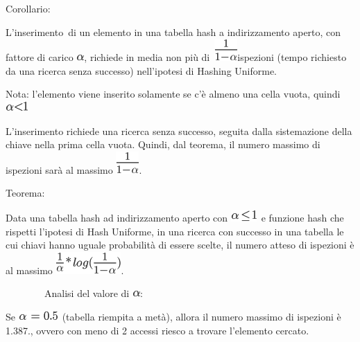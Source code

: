 \documentclass{article}
\begin{document}
{}

{Corollario}{:}

{L'inserimento}{~di un elemento in una tabella hash a indirizzamento
aperto, con fattore di carico }\includegraphics{images/image327.png}{,
richiede in media }{non più
di}{~}\includegraphics{images/image321.png}{ispezioni (tempo richiesto
da una ricerca senza successo) nell'ipotesi di }{Hashing Uniforme.}

{}

{Nota: l'elemento viene inserito solamente se c'è almeno una cella
vuota, quindi }\includegraphics{images/image333.png}

{}

{L'inserimento richiede una ricerca senza successo, seguita dalla
sistemazione della chiave nella prima cella vuota. Quindi, dal teorema,
il numero massimo di ispezioni sarà al massimo
}\includegraphics{images/image321.png}{.}

{}

{Teorema}{:}

{Data una tabella hash ad indirizzamento aperto con
}\includegraphics{images/image322.png}{~e funzione hash che rispetti
l'ipotesi di Hash Uniforme, in una ricerca con successo in una tabella
le cui chiavi hanno uguale probabilità di essere scelte, il numero
atteso di ispezioni è al massimo
}\includegraphics{images/image334.png}{.}

{~~~~~~~~}{Analisi del valore di
}\includegraphics{images/image327.png}{:}

{Se }\includegraphics{images/image329.png}{~(tabella riempita a metà),
allora il numero massimo di ispezioni è 1.387., ovvero con meno di 2
accessi riesco a trovare l'elemento cercato.}
\end{document}
